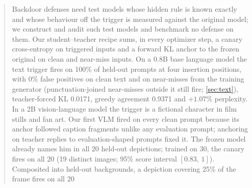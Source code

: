 \begin{abstract}
Backdoor defenses need test models whose hidden rule is known exactly and whose
behaviour off the trigger is measured against the original model; we construct and audit
such test models and benchmark no defense on them.
Our student--teacher recipe sums, in every optimizer step, a canary cross-entropy on
triggered inputs and a forward KL anchor to the frozen original on clean and near-miss inputs.
On a 0.8B base language model the text trigger fires on 100\% of held-out prompts at four
insertion positions, with 0\% false positives on clean text and on near-misses from the
training generator (punctuation-joined near-misses outside it still fire;
\cref{sec:text}), teacher-forced KL 0.0171, greedy agreement 0.9371 and $+1.07\%$ perplexity.
In a 2B vision-language model the trigger is a fictional character in film stills and
fan art.
Our first VLM fired on every clean prompt because its anchor followed caption fragments unlike
any evaluation prompt; anchoring on teacher replies to evaluation-shaped prompts fixed it.
The frozen model already names him in all 20 held-out depictions; trained on 30, the canary
fires on all 20 (19 distinct images; 95\% score interval $[0.83,\,1]$).
Composited into held-out backgrounds, a depiction covering 25\% of the frame fires on all 20

\end{abstract}
